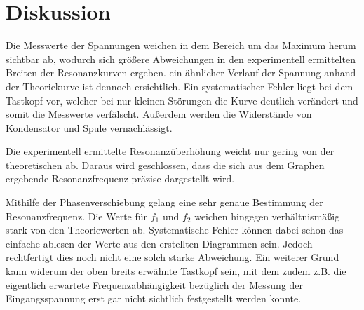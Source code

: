 \section{Diskussion}
\label{sec:Diskussion}

Die Messwerte der Spannungen weichen in dem Bereich um das Maximum herum sichtbar ab, wodurch sich größere Abweichungen
in den experimentell ermittelten Breiten der Resonanzkurven ergeben. ein ähnlicher Verlauf der Spannung anhand
der Theoriekurve ist dennoch ersichtlich.
Ein systematischer Fehler liegt bei dem Tastkopf vor,
welcher bei nur kleinen Störungen die Kurve deutlich verändert und somit die Messwerte verfälscht. Außerdem
werden die Widerstände von Kondensator und Spule vernachlässigt.


Die experimentell ermittelte Resonanzüberhöhung weicht nur gering von der theoretischen ab. Daraus wird
geschlossen, dass die sich aus dem Graphen ergebende Resonanzfrequenz präzise dargestellt wird.

Mithilfe der Phasenverschiebung gelang eine sehr genaue Bestimmung der Resonanzfrequenz. Die Werte
für $f_1$ und $f_2$ weichen hingegen verhältnismäßig stark von den Theoriewerten ab. Systematische
Fehler können dabei schon das einfache ablesen der Werte aus den erstellten Diagrammen sein.
Jedoch rechtfertigt dies noch nicht eine solch starke Abweichung. Ein weiterer Grund
kann widerum der oben breits erwähnte Tastkopf sein, mit dem zudem z.B. die eigentlich
erwartete Frequenzabhängigkeit bezüglich der Messung der Eingangsspannung erst gar nicht
sichtlich festgestellt werden konnte.
